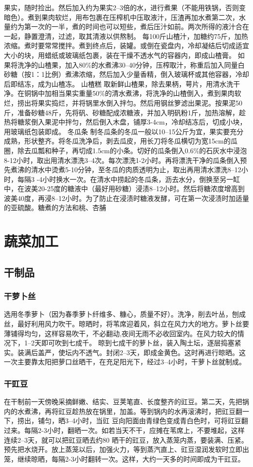 \documentclass{ctexbook}
\begin{document}
果实，随时捡出。然后加入约为果实2--3倍的水，进行煮果（不能用铁锅，否则变暗色）。煮到果肉软烂，用布包裹在压榨机中压取液汁，压渣再加水煮第二次，水量约为第一次的一半，煮的时间也可以短些，煮后压汁如前。两次所得的液汁合在一起，静置澄清，过滤，取其清液以供熬制。
每100斤山楂汁，加糖约75斤，加热浓缩。煮时要常常搅拌。煮到终点后，装罐。或倒在瓷盘内，冷却凝结后切成适宜大小的块，用蜡纸或玻璃纸包裹，装在干燥不透水气的容器内，即成山楂膏。
如果将洗净的山楂果，加入80\%的水煮沸30--40分钟，压榨取汁，称重后加入同量白砂糖（按1：1比例）煮沸浓缩，然后加入少量香精，倒入玻璃杯或其他容器，冷却后即结冻，成为山楂冻。
山楂糕
取新鲜山楂果，除去果柄，萼片，用清水洗干净。在铜锅中加相当果实重量50\%的清水煮沸，将洗净的山楂倒入，煮到果肉软烂，捞出将果实捣烂，并将锅里水倒入拌匀。然后用钢丝箩滤出果泥。按果泥50斤，准备砂糖48斤，先将矾、砂糖配成浓糖液，并加入明矾粉1斤，加热溶解，趁热将糖浆倒入果泥中拌匀，然后倒入木盘，铺厚3-4cm，冷却结冻后，切成小块，用玻璃纸包装即成。
冬瓜条
制冬瓜条的冬瓜一般以10--15公斤为宜，果实要充分成熟，形状整齐。将冬瓜洗净后，剥去瓜皮，用长刀将冬瓜横切为宽15cm的瓜圈，除去瓜瓢和种子，再切成1.5cm的小条。切好的瓜条倒入0.6\%的石灰水中浸泡8-12小时，取出用清水漂洗3--4次。每次漂洗1-2小时。再将漂洗干净的瓜条倒入预先煮沸的清水中烫煮5-10分钟，至冬瓜的肉质透明为止，取出再用清水漂洗8--12小时，每隔3
-4小时换水一次。在清水中捞起的冬瓜条，沥去水分，倒换至另一缸中，在波美20-25度的糖液中（最好用砂糖）浸渍8--12小时。然后将糖浓度增高到波美40度，再浸8--12小时。为了防止在浸渍时糖液发酵，可在第一次浸渍时加适量的亚硫酸。糖煮的方法和桃、杏脯


\chapter{蔬菜加工}
\section{干制品}
\subsection{干萝卜丝}
选用冬季萝卜（因为春季萝卜纤维多、糠心，质量不好）。洗净，削去叶丛，刨成丝，最好利用风力吹干。晾晒时，将苇席迎着风，斜立在风力大的地方。萝卜丝要薄铺得均匀，这样容易吹干，不必翻动,夜间无雨不必收回室内。在风力较大的情况下，1--2天即可吹到七成千。
晾到七成干的萝卜丝，装入陶土坛，逐层捣塞紧实。装满后盖严，使坛内不透气。封闭2--3天，即成金黄色。这时再进行晾晒。这一次主要靠太阳把萝口丝晒干，在充足阳光下，经过3--4小时，干萝卜丝就制成。
\subsection{干豇豆}
在干制前一天傍晚采摘鲜嫩、结实、豆荚笔直、长度整齐的豇豆。第二天，先把锅内的水煮沸，再将豇豆趁热放在锅里，加盖。等到锅内的水再滚沸时，把豇豆翻一下，捞出，铺匀，晒3--4小时，当豇
豆向阳面由青绿色变成青白色时，可将豇豆翻过来。每隔2-3小时，翻晒一次。如若当天不干，应摊在苇席上，不要堆起，这样连续2--3天，就可以把豇豆晒去约80%
晒干的豇豆，放入蒸笼内蒸，要装满、压紧。预先把水烧开。放上蒸笼以后，加强火力，等到蒸汽直上、豇豆湿润发软时立即出笼，继续晾晒，每隔2-3小时翻转一次。这样，大约一天多的时间即成为干豇豆。
\end{document}
